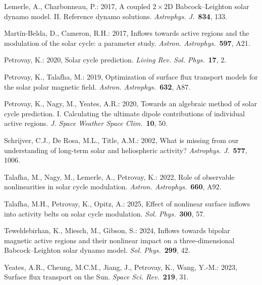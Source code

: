 \documentclass[namedreferences,hyperref,optionalrh,solaromanenum]{spr-sola}
\newcommand{\aap}{{\it Astron. Astrophys.}}
\newcommand{\apj}{{\it Astrophys. J.}}
\newcommand{\solphys}{{\it Sol. Phys.}}
\newcommand{\lrsp}{{\it Living Rev. Sol. Phys.}}
\newcommand{\jswsc}{{\it J. Space Weather Space Clim.}}
\newcommand{\ssr}{{\it Space Sci. Rev.}}
\begin{document}
\begin{thebibliography}{}
Lemerle, A., Charbonneau, P.: 2017, A coupled $2\times2$D
Babcock--Leighton solar dynamo model. II. Reference dynamo solutions.
\apj\ {\bf 834}, 133.

Mart\'in-Belda, D., Cameron, R.H.: 2017, Inflows towards active regions
and the modulation of the solar cycle: a parameter study. \aap\
{\bf 597}, A21.

Petrovay, K.: 2020, Solar cycle prediction. \lrsp\ {\bf 17}, 2.

Petrovay, K., Talafha, M.: 2019, Optimization of surface flux transport
models for the solar polar magnetic field. \aap\ {\bf 632}, A87.

Petrovay, K., Nagy, M., Yeates, A.R.: 2020, Towards an algebraic method
of solar cycle prediction. I. Calculating the ultimate dipole
contributions of individual active regions. \jswsc\ {\bf 10}, 50.

Schrijver, C.J., De Rosa, M.L., Title, A.M.: 2002, What is missing from
our understanding of long-term solar and heliospheric activity? \apj\
{\bf 577}, 1006.

Talafha, M., Nagy, M., Lemerle, A., Petrovay, K.: 2022, Role of
observable nonlinearities in solar cycle modulation. \aap\ {\bf 660},
A92.

Talafha, M.H., Petrovay, K., Opitz, A.: 2025, Effect of nonlinear surface
inflows into activity belts on solar cycle modulation. \solphys\
{\bf 300}, 57.

Teweldebirhan, K., Miesch, M., Gibson, S.: 2024, Inflows towards bipolar
magnetic active regions and their nonlinear impact on a three-dimensional
Babcock--Leighton solar dynamo model. \solphys\ {\bf 299}, 42.

\bibitem[Yeates et al.(2023)]{Yeates2023}
Yeates, A.R., Cheung, M.C.M., Jiang, J., Petrovay, K., Wang, Y.-M.: 2023,
Surface flux transport on the Sun. \ssr\ {\bf 219}, 31.

\end{thebibliography}
\end{document}
